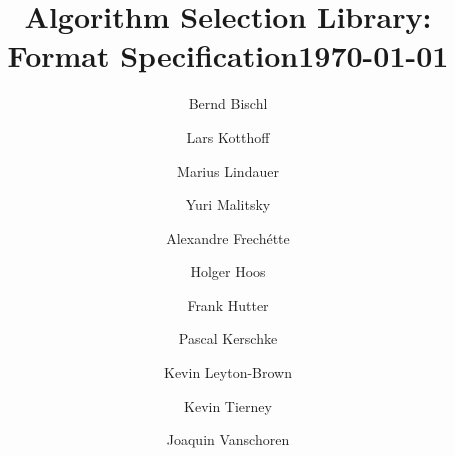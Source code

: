 \documentclass[]{elsarticle}
\begin{document}
\title{Algorithm Selection Library: Format Specification\newline \newline \today}



\address[dortmund]{University of Dortmund; Germany}
\address[cork]{Cork Constraint Computation Centre, Ireland}
\address[freiburg]{University of Freiburg, Germany}
\address[vancouver]{University of British Columbia, Vancouver, Canada}
\address[muenster]{University of M\"unster; Germany}
\address[paderborn]{University of Paderborn, Germany}
\address[tue]{Eindhoven University of Technology, The Netherlands}

\author[dortmund]{Bernd Bischl}

\author[cork]{Lars Kotthoff}

\author[freiburg]{Marius Lindauer}

\author[cork]{Yuri Malitsky}


\author[vancouver]{Alexandre Frech\'{e}tte} %

\author[vancouver]{Holger Hoos} %

\author[freiburg]{Frank Hutter} %

\author[muenster]{Pascal Kerschke} %

\author[vancouver]{Kevin Leyton-Brown} %

\author[paderborn]{Kevin Tierney} %

\author[tue]{Joaquin Vanschoren} %


% 

\maketitle

%

%


\end{document}
